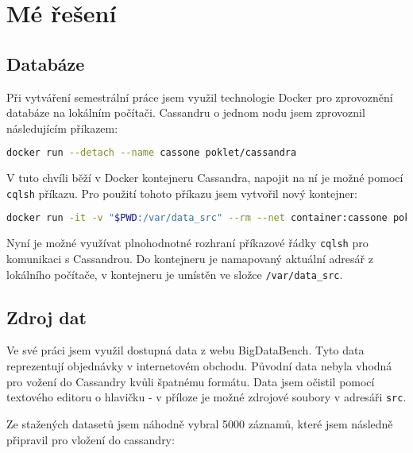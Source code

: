 \documentclass[czech]{article}
\begin{document}
\section{Mé řešení}

\subsection{Databáze}

Při vytváření semestrální práce jsem využil technologie Docker pro zprovoznění databáze na lokálním počítači. Cassandru o jednom nodu jsem zprovoznil následujícím příkazem\cite{cassandra-github}:

\begin{lstlisting}[language=bash]
docker run --detach --name cassone poklet/cassandra
\end{lstlisting}

V tuto chvíli běží v Docker kontejneru Cassandra, napojit na ní je možné pomocí \lstinline{cqlsh} příkazu. Pro použití tohoto příkazu jsem vytvořil nový kontejner:

\begin{lstlisting}[language=bash]
docker run -it -v "$PWD:/var/data_src" --rm --net container:cassone poklet/cassandra cqlsh

\end{lstlisting}

Nyní je možné využívat plnohodnotné rozhraní příkazové řádky \lstinline{cqlsh} pro komunikaci s Cassandrou. Do kontejneru je namapovaný aktuální adresář z lokálního počítače, v kontejneru je umístěn ve složce \lstinline{/var/data_src}.

\subsection{Zdroj dat}

Ve své práci jsem využil dostupná data z webu BigDataBench\cite{bigdatabench}. Tyto data reprezentují objednávky v internetovém obchodu. Původní data nebyla vhodná pro vožení do Cassandry kvůli špatnému formátu. Data jsem očistil pomocí textového editoru o hlavičku - v příloze je možné zdrojové soubory v adresáři \lstinline{src}.

Ze stažených datasetů jsem náhodně vybral 5000 záznamů, které jsem následně připravil pro vložení do cassandry:




\end{document}
